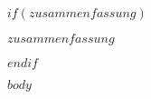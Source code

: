 \documentclass[12pt,twoside]{reedthesis}
\begin{document}
$if(zusammenfassung)$
  \begin{zusammenfassung}
    $zusammenfassung$
  \end{zusammenfassung}
$endif$



\mainmatter %
\pagestyle{fancyplain} %

$body$




\end{document}
